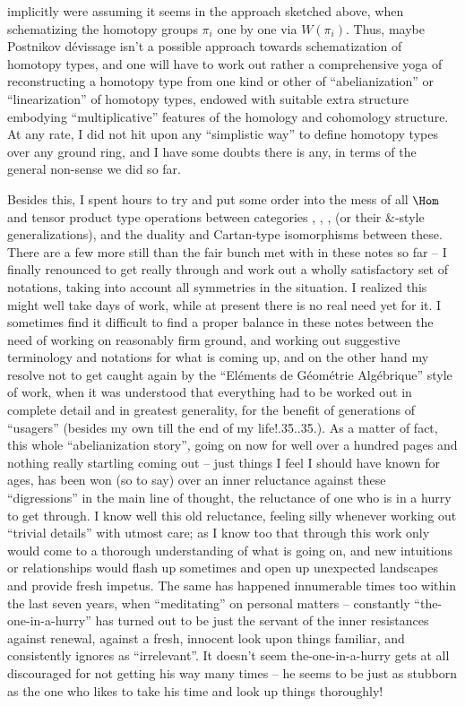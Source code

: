 implicitly were assuming it seems in the approach sketched above, when
schematizing the homotopy groups $\pi_i$ one by one via
$W(\pi_i)$. Thus, maybe Postnikov dévissage isn't a possible approach
towards schematization of homotopy types, and one will have to work
out rather a comprehensive yoga of reconstructing a homotopy type from
one kind or other of ``abelianization'' or ``linearization'' of
homotopy types, endowed with suitable extra structure embodying
``multiplicative'' features of the homology and cohomology
structure. At any rate, I did not hit upon any ``simplistic way'' to
define homotopy types over any ground ring, and I have some doubts
there is any, in terms of the general non-sense we did so far.

Besides this, I spent hours to try and put some order into
the mess of all $\Hom$ and tensor product type operations between
categories \Ahatk, \AhatM, \Bhatk, \BhatM{} (or their $\&$-style
generalizations), and the duality and Cartan-type isomorphisms between
these. There are a few more still than the fair bunch met with in
these notes so far -- I finally renounced to get really through and
work out a wholly satisfactory set of notations, taking into account
all symmetries in the situation. I realized this might well take days
of work, while at present there is no real need yet for it. I
sometimes find it difficult to find a proper balance in these notes
between the need of working on reasonably firm ground, and working out
suggestive terminology and notations for what is coming up, and on the
other hand my resolve not to get caught again by the ``Eléments de
Géométrie Algébrique'' style of work, when it was understood that
everything had to be worked out in complete detail and in greatest
generality, for the benefit of generations of
``usagers'' (besides my own till the end of my
life!\kern.35\font.\kern.35\font.). As a matter
of fact, this whole ``abelianization story'', going on now for well
over a hundred pages and nothing really startling coming out -- just
things I feel I should have known for ages, has been won (so to say)
over an inner reluctance against these ``digressions'' in the main
line of thought, the reluctance of one who is in a hurry to get
through. I know well this old reluctance, feeling silly whenever
working out ``trivial details'' with utmost care; as I know too that
through this work only would come to a thorough understanding of what
is going on, and new intuitions or relationships would flash up
sometimes and open up unexpected landscapes and provide fresh
impetus. The same has happened innumerable times too within the last
seven years, when ``meditating'' on personal matters -- constantly
``the-one-in-a-hurry'' has turned out to be just the servant of the
inner resistances against renewal, against a fresh, innocent look upon
things familiar, and consistently ignores as ``irrelevant''. It
doesn't seem the-one-in-a-hurry gets at all discouraged for not
getting his way many times -- he seems to be just as stubborn as the
one who likes to take his time and look up things thoroughly!


